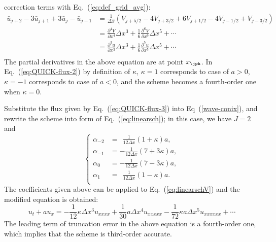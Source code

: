 \documentclass[]{article}
\begin{document}
correction terms with Eq.~(\ref{eq:def_grid_avg}): 
\begin{equation*}
    \begin{array}{ll}
	\bar u_{j+2}-3\bar u_{j+1}+3\bar u_{j}-\bar u_{j-1}&
	\displaystyle =\frac{1}{\Delta x}
	\left(V_{j+5/2}-4V_{j+3/2}+6V_{j+1/2}-4V_{j-1/2}+V_{j-3/2}\right) \\[3mm]
	&\displaystyle
	=\frac{\partial^4 V}{\partial x^4}\Delta x^3+\frac{1}{6}\frac{\partial^6V}{\partial x^6}\Delta x^5 + \cdots \\[3mm]
	&\displaystyle
	=\frac{\partial^3 u}{\partial x^3}\Delta x^3+\frac{1}{6}\frac{\partial^5u}{\partial x^5}\Delta x^5 + \cdots \\
    \end{array}
\end{equation*}
The partial derivatives in the above equation are at point $x_\jph$. In
Eq.~(\ref{eq:QUICK-flux-2}) by definition of $\kappa$, $\kappa=1$ corresponds to
case of $a>0$, $\kappa=-1$ corresponds to case of $a<0$, and the scheme becomes
a fourth-order one when $\kappa=0$.

Substitute the flux given by Eq.~(\ref{eq:QUICK-flux-3}) into
Eq~(\ref{wave-conix}), and rewrite the scheme into form of
Eq.~(\ref{eq:linearsch}); in this case, we have $J = 2$ and
\begin{equation}
    \left\{\begin{array}{ll}
	\alpha_{-2}&\displaystyle =\ \ \frac{1}{12\Delta x}(1+\kappa)a,\\[3mm]
	\alpha_{-1}&\displaystyle = -\frac{1}{12\Delta x}(7+3\kappa)a,\\[3mm]
	\alpha_{0}&\displaystyle = -\frac{1}{12\Delta x}(7-3\kappa)a,\\[3mm]
	\alpha_{1}&\displaystyle =\ \ \frac{1}{12\Delta x}(1-\kappa)a.\\
    \end{array}\right.
    \label{eq:coeff-of-alpha-in-quick}
\end{equation}
The coefficients given above can be applied to Eq.~(\ref{eq:linearschV})
and the modified equation is obtained:
\begin{equation}
    u_t+au_x =-\frac{1}{12}\kappa \Delta x^3 u_{xxxx}+\frac{1}{30}a \Delta x^4 u_{xxxxx} -\frac{1}{72} \kappa a \Delta x^5 u_{xxxxxx} +\cdots
    \label{eq:modified-quick}
\end{equation}
The leading term of truncation error in the above equation is a fourth-order
one, which implies that the scheme is third-order accurate.
\end{document}
